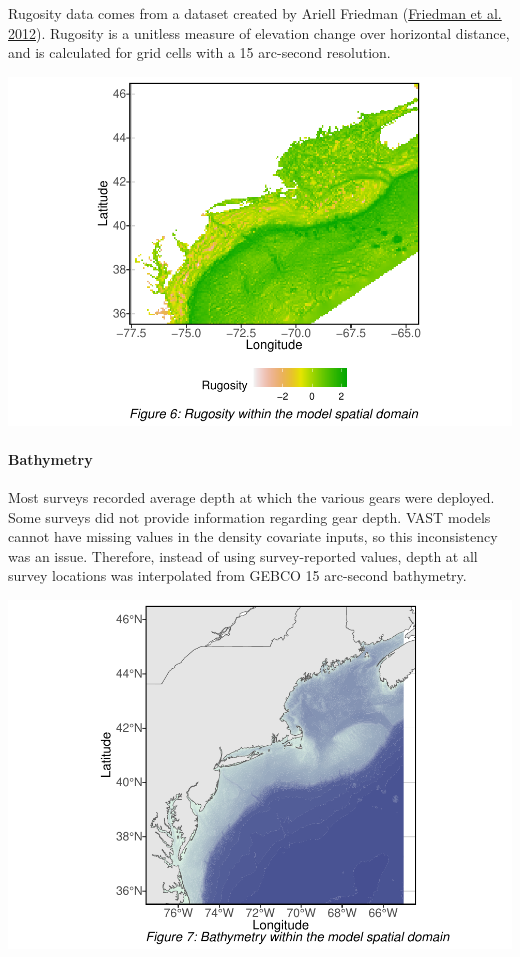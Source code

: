 \documentclass[
]{article}
\begin{document}
Rugosity data comes from a dataset created by Ariell Friedman (\protect\hyperlink{ref-friedman_2012}{Friedman et al. 2012}). Rugosity is a unitless measure of elevation change over horizontal distance, and is calculated for grid cells with a 15 arc-second resolution.

\includegraphics{ToR1_TechPaper_files/figure-latex/rugosity-1.pdf}

\hypertarget{bathymetry}{%
\paragraph{Bathymetry}\label{bathymetry}}

Most surveys recorded average depth at which the various gears were deployed. Some surveys did not provide information regarding gear depth. VAST models cannot have missing values in the density covariate inputs, so this inconsistency was an issue. Therefore, instead of using survey-reported values, depth at all survey locations was interpolated from GEBCO 15 arc-second bathymetry.

\includegraphics{ToR1_TechPaper_files/figure-latex/bathy-1.pdf}
\end{document}
